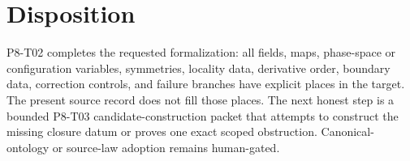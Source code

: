 \documentclass[11pt]{article}
\begin{document}
\section{Disposition}

P8-T02 completes the requested formalization: all fields, maps, phase-space
or configuration variables, symmetries, locality data, derivative order,
boundary data, correction controls, and failure branches have explicit
places in the target.  The present source record does not fill those places.
The next honest step is a bounded P8-T03 candidate-construction packet that
attempts to construct the missing closure datum or proves one exact scoped
obstruction.  Canonical-ontology or source-law adoption remains human-gated.
\end{document}
